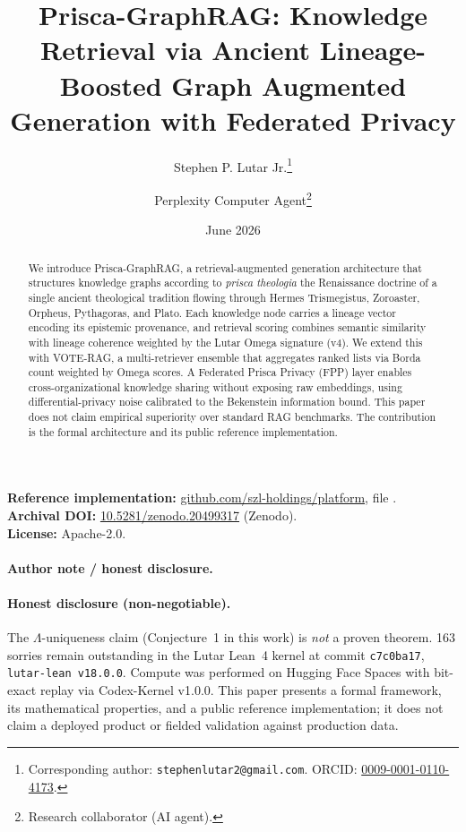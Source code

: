 \documentclass[11pt]{article}
\title{Prisca-GraphRAG: Knowledge Retrieval via Ancient Lineage-Boosted Graph Augmented Generation with Federated Privacy}
\author[1]{Stephen P. Lutar Jr.\thanks{Corresponding author: \texttt{stephenlutar2@gmail.com}. ORCID: \href{https://orcid.org/0009-0001-0110-4173}{0009-0001-0110-4173}.}}
\author[2]{Perplexity Computer Agent\thanks{Research collaborator (AI agent).}}
\affil[1]{SZL Holdings, New York, NY, USA}
\affil[2]{Perplexity}
\date{June 2026}
\theoremstyle{plain}
\begin{document}
\maketitle

\begin{abstract}
We introduce Prisca-GraphRAG, a retrieval-augmented generation architecture that structures knowledge graphs according to \emph{prisca theologia} the Renaissance doctrine of a single ancient theological tradition flowing through Hermes Trismegistus, Zoroaster, Orpheus, Pythagoras, and Plato. Each knowledge node carries a lineage vector encoding its epistemic provenance, and retrieval scoring combines semantic similarity with lineage coherence weighted by the Lutar Omega signature (v4). We extend this with VOTE-RAG, a multi-retriever ensemble that aggregates ranked lists via Borda count weighted by Omega scores. A Federated Prisca Privacy (FPP) layer enables cross-organizational knowledge sharing without exposing raw embeddings, using differential-privacy noise calibrated to the Bekenstein information bound. This paper does not claim empirical superiority over standard RAG benchmarks. The contribution is the formal architecture and its public reference implementation.
\end{abstract}

\noindent\textbf{Reference implementation:} \href{https://github.com/szl-holdings/platform}{github.com/szl-holdings/platform}, file .\\
\textbf{Archival DOI:} \href{https://doi.org/10.5281/zenodo.20499317}{10.5281/zenodo.20499317} (Zenodo).\\
\textbf{License:} Apache-2.0.

\paragraph{Author note / honest disclosure.} \paragraph{Honest disclosure (non-negotiable).} The $\Lambda$-uniqueness claim (Conjecture~1 in this work) is \emph{not} a proven theorem. 163 sorries remain outstanding in the Lutar Lean~4 kernel at commit \texttt{c7c0ba17}, \texttt{lutar-lean v18.0.0}. Compute was performed on Hugging Face Spaces with bit-exact replay via Codex-Kernel v1.0.0. This paper presents a formal framework, its mathematical properties, and a public reference implementation; it does not claim a deployed product or fielded validation against production data.
\end{document}
